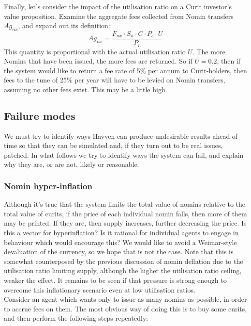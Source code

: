 \noindent Finally, let's consider the impact of the utilisation ratio on a Curit investor's value proposition. Examine the aggregate fees collected from Nomin transfers \(Ag_{nx}\), and expand out its definition:
\[Ag_{nx} = \frac{F_{nx} \cdot S_n \cdot C \cdot P_c \cdot U}{P_n}\]
This quantity is proportional with the actual utilisation ratio \(U\). The more Nomins that have been issued, the more fees are returned. So if \(U = 0.2\), then if the system would like to return a fee rate of 5\% per annum to Curit-holders, then fees to the tune of 25\% per year will have to be levied on Nomin transfers, assuming no other fees exist. This may be a little high.

\pagebreak
\subsection{Failure modes}

We must try to identify ways Havven can produce undesirable results ahead of time
so that they can be simulated and, if they turn out to be real issues, patched.
In what follows we try to identify ways the system can fail, and explain why
they are, or are not, likely or reasonable.

\subsubsection{Nomin hyper-inflation}

Although it's true that the system limits the total value of nomins relative to the
total value of curits, if the price of each individual nomin falls, then more of them may
be printed. If they are, then supply increases, further decreasing the price.
Is this a vector for hyperinflation? Is it rational for individual agents to engage
in behaviour which would encourage this?
We would like to avoid a Weimar-style devaluation of the currency, so we hope that is not
the case. 
Note that this is somewhat counterposed by the previous discussion of nomin deflation
due to the utilisation ratio limiting supply, although the higher the utilisation ratio
ceiling, weaker the effect. It remains to be seen if that pressure is strong
enough to overcome this inflationary scenario even at low utilisation ratios. \\

Consider an agent which wants only to issue as many nomins as possible, in order to accrue fees on them.
The most obvious way of doing this is to buy some curits, and then perform the following steps repeatedly:

